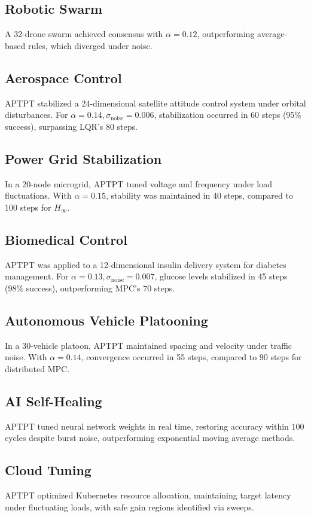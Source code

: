 \documentclass[12pt]{article}
\begin{document}
\subsection{Robotic Swarm}
A 32-drone swarm achieved consensus with $\alpha=0.12$, outperforming average-based rules, which diverged under noise.

\subsection{Aerospace Control}
APTPT stabilized a 24-dimensional satellite attitude control system under orbital disturbances. For $\alpha=0.14, \sigma_{\text{noise}}=0.006$, stabilization occurred in 60 steps (95\% success), surpassing LQR’s 80 steps.

\subsection{Power Grid Stabilization}
In a 20-node microgrid, APTPT tuned voltage and frequency under load fluctuations. With $\alpha=0.15$, stability was maintained in 40 steps, compared to 100 steps for $H_\infty$.

\subsection{Biomedical Control}
APTPT was applied to a 12-dimensional insulin delivery system for diabetes management. For $\alpha=0.13, \sigma_{\text{noise}}=0.007$, glucose levels stabilized in 45 steps (98\% success), outperforming MPC’s 70 steps.

\subsection{Autonomous Vehicle Platooning}
In a 30-vehicle platoon, APTPT maintained spacing and velocity under traffic noise. With $\alpha=0.14$, convergence occurred in 55 steps, compared to 90 steps for distributed MPC.

\subsection{AI Self-Healing}
APTPT tuned neural network weights in real time, restoring accuracy within 100 cycles despite burst noise, outperforming exponential moving average methods.

\subsection{Cloud Tuning}
APTPT optimized Kubernetes resource allocation, maintaining target latency under fluctuating loads, with safe gain regions identified via sweeps.
\end{document}
